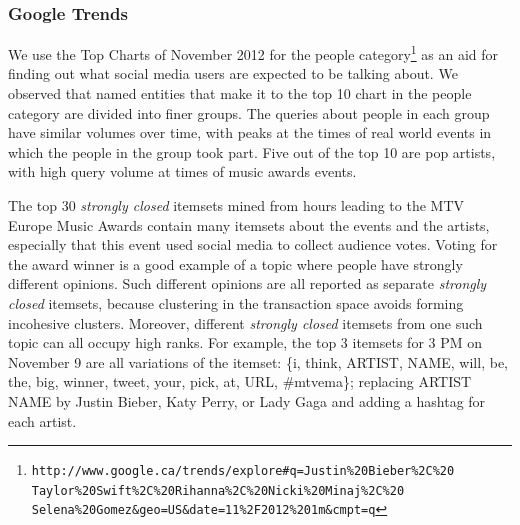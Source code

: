 \documentclass{sig-alternate}
\begin{document}
\subsubsection{Google Trends}
We use the Top Charts of November 2012 
for the people category\footnote{\scriptsize 
\texttt{http://www.google.ca/trends/explore\#q=Justin\%20Bieber\%2C\%20\\
Taylor\%20Swift\%2C\%20Rihanna\%2C\%20Nicki\%20Minaj\%2C\%20\\
Selena\%20Gomez\&geo=US\&date=11\%2F2012\%201m\&cmpt=q}}
as an aid for finding out what social media users
are expected to be talking about.
We observed that named entities that make it to the top 10 chart in the people 
category  are divided into finer groups. 
The queries about 
people in each group 
have similar volumes over time, 
with peaks at the times of real world events
in which the people in the group took part.
Five out of the top 10 are pop artists, 
with high query volume at times of music awards events.

The top 30 \emph{strongly closed} itemsets mined from hours leading to 
the MTV Europe Music Awards contain
many itemsets about the events and the artists, 
especially that this event used social media to collect audience votes. 
Voting for the award winner is 
a good example of a topic where people have strongly different opinions.
Such different opinions are all reported as separate \emph{strongly closed} itemsets, 
because clustering in the transaction space avoids forming incohesive clusters. 
Moreover, different  \emph{strongly closed} itemsets from one such topic
can all occupy high ranks.
For example, the top 3 itemsets for 3 PM on November 9 are all variations of the %
itemset: \{i, think, ARTIST, NAME, will, be, the, big, winner, tweet, your, pick, at, URL, %
\#mtvema\}; replacing ARTIST NAME by Justin Bieber, Katy Perry, or Lady Gaga and adding a hashtag for each artist.
\end{document}
